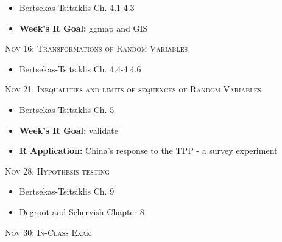 \documentclass[11pt]{article}
\begin{document}
\begin{itemize}

 \item Bertsekas-Tsitsiklis Ch. 4.1-4.3
 
 
\item  {\bf Week's R Goal:} ggmap and GIS
 
\end{itemize}

\noindent \textsc{Nov 16: Transformations of Random Variables}

\begin{itemize}

 \item Bertsekas-Tsitsiklis Ch. 4.4-4.4.6


\end{itemize}

\noindent \textsc{Nov 21: Inequalities and limits of sequences of Random Variables}

\begin{itemize}

 \item Bertsekas-Tsitsiklis Ch. 5
 
  
\item  {\bf Week's R Goal:} validate 
 \item  {\bf R Application:} China's response to the TPP - a survey experiment

\end{itemize}

\noindent \textsc{Nov 28: Hypothesis testing}

\begin{itemize}

 \item Bertsekas-Tsitsiklis Ch. 9
 \item Degroot and Schervish Chapter 8

\end{itemize}

\noindent \textsc{Nov 30: \underline{In-Class Exam}}
\end{document}
